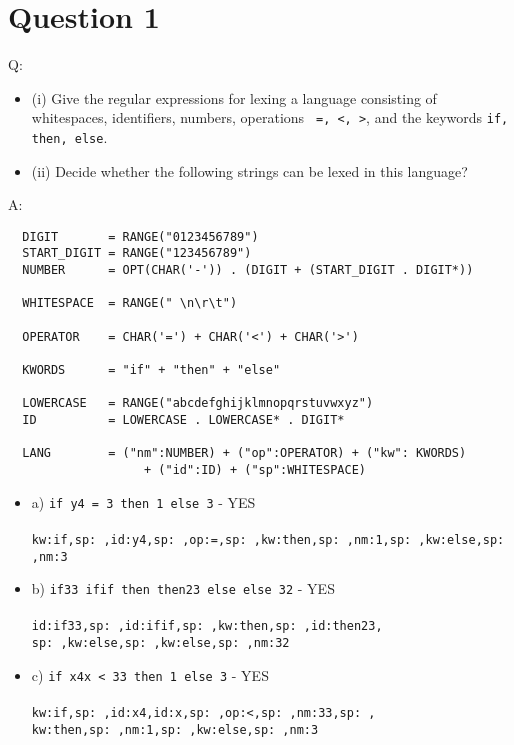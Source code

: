 \documentclass[english]{scrartcl}
\begin{document}
\section*{Question 1}
Q: \begin{itemize}
  \item (i) Give the regular expressions for lexing a language consisting of whitespaces, identifiers, numbers, operations \verb~ =, <, >~, and the keywords \verb~if, then, else~.
  \item (ii) Decide whether the following strings can be lexed in this language?
\end{itemize}
A:
\begin{verbatim}
  DIGIT       = RANGE("0123456789")
  START_DIGIT = RANGE("123456789")
  NUMBER      = OPT(CHAR('-')) . (DIGIT + (START_DIGIT . DIGIT*))

  WHITESPACE  = RANGE(" \n\r\t")

  OPERATOR    = CHAR('=') + CHAR('<') + CHAR('>')

  KWORDS      = "if" + "then" + "else"

  LOWERCASE   = RANGE("abcdefghijklmnopqrstuvwxyz")
  ID          = LOWERCASE . LOWERCASE* . DIGIT*

  LANG        = ("nm":NUMBER) + ("op":OPERATOR) + ("kw": KWORDS)
                   + ("id":ID) + ("sp":WHITESPACE)
\end{verbatim}
\begin{itemize}
  \item a) \verb~if y4 = 3 then 1 else 3~ - YES \\ \\
      \verb~kw:if,sp: ,id:y4,sp: ,op:=,sp: ,kw:then,sp: ,nm:1,sp: ,kw:else,sp: ,nm:3~
  \item b) \verb~if33 ifif then then23 else else 32~ - YES \\ \\
       \verb~id:if33,sp: ,id:ifif,sp: ,kw:then,sp: ,id:then23,~ \\ \verb~sp: ,kw:else,sp: ,kw:else,sp: ,nm:32~
  \item c) \verb~if x4x < 33 then 1 else 3~ - YES \\ \\
      \verb~kw:if,sp: ,id:x4,id:x,sp: ,op:<,sp: ,nm:33,sp: ,~ \\ \verb~kw:then,sp: ,nm:1,sp: ,kw:else,sp: ,nm:3~
\end{itemize}


\end{document}
